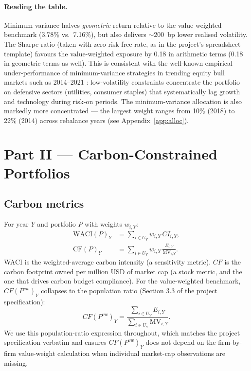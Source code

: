 \documentclass[11pt,a4paper]{article}
\begin{document}
\paragraph{Reading the table.} Minimum variance halves \emph{geometric}
return relative to the value-weighted benchmark (3.78\% vs.\ 7.16\%), but
also delivers $\sim$200~bp lower realised volatility. The Sharpe ratio
(taken with zero risk-free rate, as in the project's spreadsheet template)
favours the value-weighted exposure by 0.18 in arithmetic terms (0.18 in
geometric terms as well). This is consistent with the well-known empirical
under-performance of minimum-variance strategies in trending equity bull
markets such as 2014--2021 \citep{Clarke2006MinVar}: low-volatility
constraints concentrate the portfolio on defensive sectors (utilities,
consumer staples) that systematically lag growth and technology during
risk-on periods. The minimum-variance allocation is also markedly more
concentrated --- the largest weight ranges from 10\% (2018) to 22\% (2014)
across rebalance years (see Appendix~\ref{app:alloc}).

\section{Part II --- Carbon-Constrained Portfolios}\label{sec:partII}

\subsection{Carbon metrics}\label{sec:metrics}

For year $Y$ and portfolio $P$ with weights $w_{i,Y}$:
\begin{align}
  \text{WACI}(P)_Y &= \sum_{i\in U_Y} w_{i,Y}\, CI_{i,Y},
  \label{eq:waci}\\[2pt]
  \text{CF}(P)_Y &= \sum_{i\in U_Y} w_{i,Y}\,\frac{E_{i,Y}}{\text{MV}_{i,Y}}.
  \label{eq:cf}
\end{align}
WACI is the weighted-average carbon intensity (a sensitivity metric).
$CF$ is the carbon footprint owned per million USD of market cap (a stock
metric, and the one that drives carbon budget compliance). For the
value-weighted benchmark, $CF(P^{vw})_Y$ collapses to the population
ratio (Section 3.3 of the project specification):
\[
  CF(P^{vw})_Y = \frac{\sum_{i\in U_Y} E_{i,Y}}{\sum_{i\in U_Y} \text{MV}_{i,Y}}.
\]
We use this population-ratio expression throughout, which matches the
project specification verbatim and ensures $CF(P^{vw})_Y$ does not
depend on the firm-by-firm value-weight calculation when individual
market-cap observations are missing.
\end{document}
